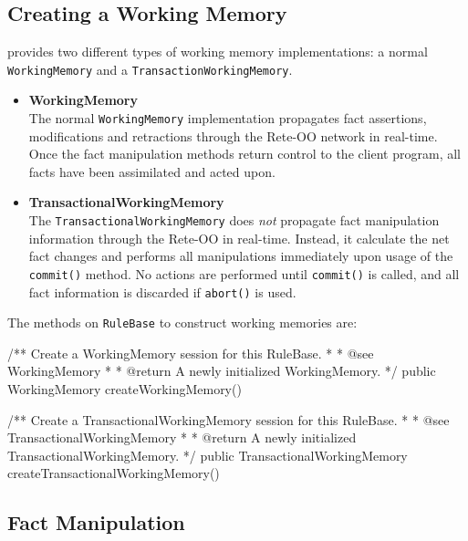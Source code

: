 \newpage

\subsection{Creating a Working Memory}

\drools{} provides two different types of working memory
implementations: a normal \verb|WorkingMemory| and a
\verb|TransactionWorkingMemory|.

\begin{itemize}

	\item \textbf{\textsf{WorkingMemory}} \\
		The normal \verb|WorkingMemory| implementation 
		propagates fact assertions, modifications and
		retractions through the Rete-OO network in
		real-time.  Once the fact manipulation 
		methods return control to the client program,
		all facts have been assimilated and acted upon.

	\item \textbf{\textsf{TransactionalWorkingMemory}} \\
		The \verb|TransactionalWorkingMemory| does \emph{not}
		propagate fact manipulation information through the
		Rete-OO in real-time.  Instead, it calculate the net
		fact changes and performs all manipulations immediately
		upon usage of the \verb|commit()| method.  No actions
		are performed until \verb|commit()| is called, and
		all fact information is discarded if \verb|abort()|
		is used.

\end{itemize}

The methods on \verb|RuleBase| to construct working memories are:

\bigskip

\begin{codelisting}    
/** Create a WorkingMemory session for this RuleBase.
 *
 *  @see WorkingMemory
 *
 *  @return A newly initialized WorkingMemory.
 */
public WorkingMemory createWorkingMemory() 

/** Create a TransactionalWorkingMemory session for this RuleBase.
 *
 *  @see TransactionalWorkingMemory
 *
 *  @return A newly initialized TransactionalWorkingMemory.
 */
public TransactionalWorkingMemory createTransactionalWorkingMemory()
\end{codelisting}

\subsection{Fact Manipulation}

